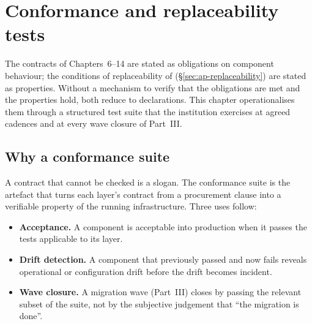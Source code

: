 
\chapter{Conformance and replaceability tests}
\label{ch:conformance}

The contracts of Chapters~6--14 are stated as obligations on
component behaviour; the conditions of replaceability of
 (\S\ref{sec:ap-replaceability}) are stated as
properties. Without a mechanism to verify that the obligations are
met and the properties hold, both reduce to declarations. This
chapter operationalises them through a structured test suite that
the institution exercises at agreed cadences and at every wave
closure of Part~III.

\section{Why a conformance suite}
\label{sec:cf-why}

A contract that cannot be checked is a slogan. The conformance suite
is the artefact that turns each layer's contract from a procurement
clause into a verifiable property of the running infrastructure.
Three uses follow:

\begin{itemize}[leftmargin=1.5em,nosep]
  \item \textbf{Acceptance.} A component is acceptable into
    production when it passes the tests applicable to its layer.
  \item \textbf{Drift detection.} A component that previously
    passed and now fails reveals operational or configuration
    drift before the drift becomes incident.
  \item \textbf{Wave closure.} A migration wave (Part~III) closes
    by passing the relevant subset of the suite, not by the
    subjective judgement that ``the migration is done''.
\end{itemize}

